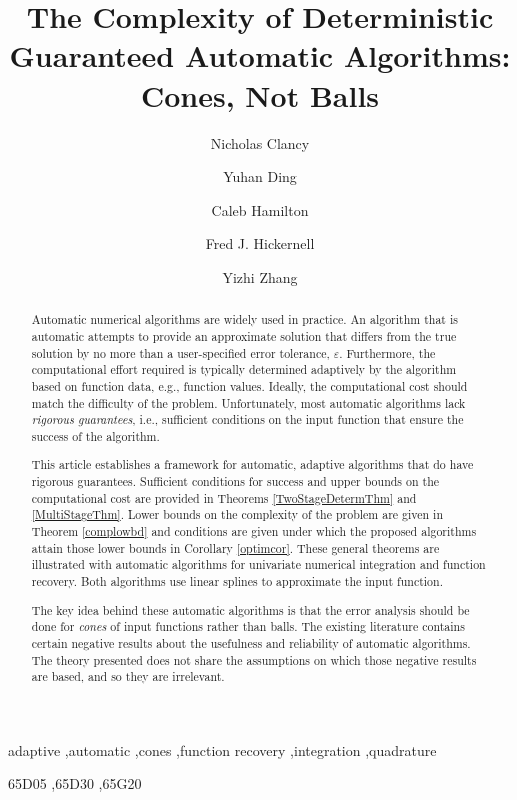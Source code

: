 \documentclass[]{elsarticle}
\theoremstyle{definition}
\theoremstyle{remark}
\begin{document}
\begin{frontmatter}

\title{The Complexity of Deterministic Guaranteed Automatic Algorithms:  Cones, Not Balls}
\author{Nicholas Clancy}
\author{Yuhan Ding}
\author{Caleb Hamilton}
\author{Fred J. Hickernell}
\author{Yizhi Zhang}
\address{Room E1-208, Department of Applied Mathematics, Illinois Institute of Technology,\\ 10 W.\ 32$^{\text{nd}}$ St., Chicago, IL 60616}
\begin{abstract} Automatic numerical algorithms are widely used in practice.  An algorithm that is automatic attempts to provide an approximate solution that differs from the true solution by no more than a user-specified error tolerance, $\varepsilon$. Furthermore, the computational effort required is typically determined adaptively by the algorithm based on function data, e.g., function values.  Ideally, the computational cost should match the difficulty of the problem.  Unfortunately, most automatic algorithms lack \emph{rigorous guarantees}, i.e., sufficient conditions on the input function that ensure the success of the algorithm. 

This article establishes a framework for automatic, adaptive algorithms that do have rigorous guarantees. Sufficient conditions for success and upper bounds on the computational cost are provided in Theorems \ref{TwoStageDetermThm} and \ref{MultiStageThm}.  Lower bounds on the complexity of the problem are given in Theorem \ref{complowbd} and conditions are given under which the proposed algorithms attain those lower bounds in Corollary \ref{optimcor}. These general theorems are illustrated with automatic algorithms for univariate numerical integration and function recovery.  Both algorithms use linear splines to approximate the input function.  

The key idea behind these automatic algorithms is that the error analysis should be done for \emph{cones} of input functions rather than balls. The existing literature contains certain negative results about the usefulness and reliability of automatic algorithms.  The theory presented does not share the assumptions on which those negative results are based, and so they are irrelevant.
\end{abstract}

\begin{keyword}
adaptive \sep automatic \sep cones \sep function recovery \sep integration \sep quadrature

\MSC[2010] 65D05 \sep 65D30 \sep 65G20

\end{keyword}
\end{frontmatter}
\end{document}
